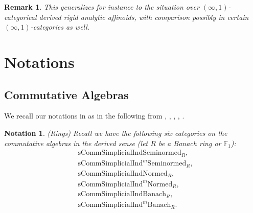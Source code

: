 \documentclass[12pt]{book}
\newtheorem{remark}{Remark}
\newtheorem{notation}{Notation}
\begin{document}
\begin{remark}
This generalizes \cite{KL1} \cite{KL2} for instance to the situation over $(\infty,1)$-categorical derived rigid analytic affinoids, with comparison possibly in certain $(\infty,1)$-categories as well. 
\end{remark}





\newpage

\section{Notations}


\subsection{Commutative Algebras}

\indent We recall our notations in \cite{T2} as in the following from \cite{BK}, \cite{BBK}, \cite{BBBK}, \cite{BBM}, \cite{KKM}.

\begin{notation}\mbox{\rm{(Rings)}}
Recall we have the following six categories on the commutative algebras in the derived sense (let $R$ be a Banach ring or $\mathbb{F}_1$):
\begin{align}
&\mathrm{sComm}\mathrm{Simplicial}\mathrm{Ind}\mathrm{Seminormed}_R,\\
&\mathrm{sComm}\mathrm{Simplicial}\mathrm{Ind}^m\mathrm{Seminormed}_R,\\
&\mathrm{sComm}\mathrm{Simplicial}\mathrm{Ind}\mathrm{Normed}_R,\\
&\mathrm{sComm}\mathrm{Simplicial}\mathrm{Ind}^m\mathrm{Normed}_R,\\
&\mathrm{sComm}\mathrm{Simplicial}\mathrm{Ind}\mathrm{Banach}_R,\\
&\mathrm{sComm}\mathrm{Simplicial}\mathrm{Ind}^m\mathrm{Banach}_R.	
\end{align}
	
\end{notation}
\end{document}
